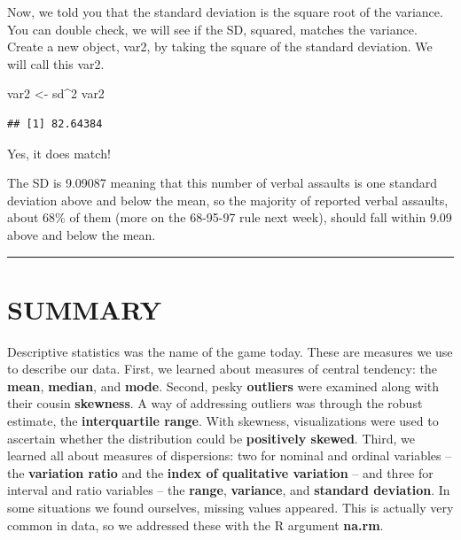\documentclass[
]{book}
\newenvironment{Shaded}{\begin{snugshade}}{\end{snugshade}}
\newcommand{\DecValTok}[1]{\textcolor[rgb]{0.00,0.00,0.81}{#1}}
\newcommand{\NormalTok}[1]{#1}
\newcommand{\OtherTok}[1]{\textcolor[rgb]{0.56,0.35,0.01}{#1}}
\newcommand{\SpecialCharTok}[1]{\textcolor[rgb]{0.00,0.00,0.00}{#1}}
\begin{document}
Now, we told you that the standard deviation is the square root of the variance. You can double check, we will see if the SD, squared, matches the variance. Create a new object, var2, by taking the square of the standard deviation. We will call this var2.

\begin{Shaded}
\begin{Highlighting}[]
\NormalTok{var2 }\OtherTok{\textless{}{-}}\NormalTok{ sd}\SpecialCharTok{\^{}}\DecValTok{2}
\NormalTok{var2 }
\end{Highlighting}
\end{Shaded}

\begin{verbatim}
## [1] 82.64384
\end{verbatim}

Yes, it does match!

The SD is 9.09087 meaning that this number of verbal assaults is one standard deviation above and below the mean, so the majority of reported verbal assaults, about 68\% of them (more on the 68-95-97 rule next week), should fall within 9.09 above and below the mean.

\begin{center}\rule{0.5\linewidth}{0.5pt}\end{center}

\hypertarget{summary-3}{%
\section{SUMMARY}\label{summary-3}}

Descriptive statistics was the name of the game today. These are measures we use to describe our data. First, we learned about measures of central tendency: the \textbf{mean}, \textbf{median}, and \textbf{mode}. Second, pesky \textbf{outliers} were examined along with their cousin \textbf{skewness}. A way of addressing outliers was through the robust estimate, the \textbf{interquartile range}. With skewness, visualizations were used to ascertain whether the distribution could be \textbf{positively skewed}. Third, we learned all about measures of dispersions: two for nominal and ordinal variables -- the \textbf{variation ratio} and the \textbf{index of qualitative variation} -- and three for interval and ratio variables -- the \textbf{range}, \textbf{variance}, and \textbf{standard deviation}. In some situations we found ourselves, missing values appeared. This is actually very common in data, so we addressed these with the R argument \textbf{na.rm}.
\end{document}
